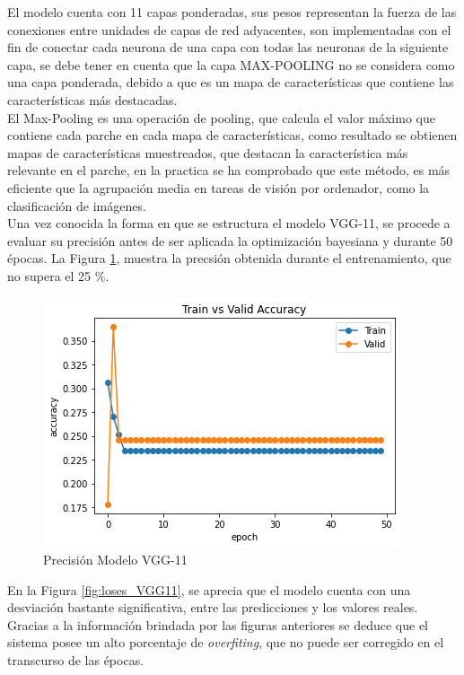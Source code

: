 El modelo cuenta con 11 capas ponderadas, sus pesos representan la fuerza de las conexiones entre unidades de capas de red adyacentes, son implementadas con el fin de conectar cada neurona de una capa con todas las neuronas de la siguiente capa, se debe tener en cuenta que la capa MAX-POOLING no se considera como una capa ponderada, debido a que es un mapa de características que contiene las características más destacadas.\\

El Max-Pooling es una operación de pooling, que calcula el valor máximo que contiene cada parche en cada mapa de características, como resultado se obtienen mapas de características muestreados, que destacan la característica más relevante en el parche, en la practica se ha comprobado que este método, es más eficiente que la agrupación media en tareas de visión por ordenador, como la clasificación de imágenes.\\		 


Una vez conocida la forma en que se estructura el modelo VGG-11, se procede a evaluar su precisión antes de ser aplicada la optimización bayesiana y durante 50 épocas. La Figura \ref{fig:precision_VGG11}, muestra la precsión obtenida durante el entrenamiento, que no supera el 25 \%.


\begin{figure}[ht]
	\centering
	\includegraphics[scale=0.5]{Figs/105.png}
	\caption{Precisión Modelo VGG-11}
	\label{fig:precision_VGG11}
\end{figure}

En la Figura \ref{fig:loses_VGG11}, se aprecia que el modelo cuenta con una desviación bastante significativa, entre las predicciones y los valores reales. Gracias a la información brindada por las figuras anteriores se deduce que el sistema posee un alto porcentaje de \textit{overfiting}, que no puede ser corregido en el transcurso de las épocas.

